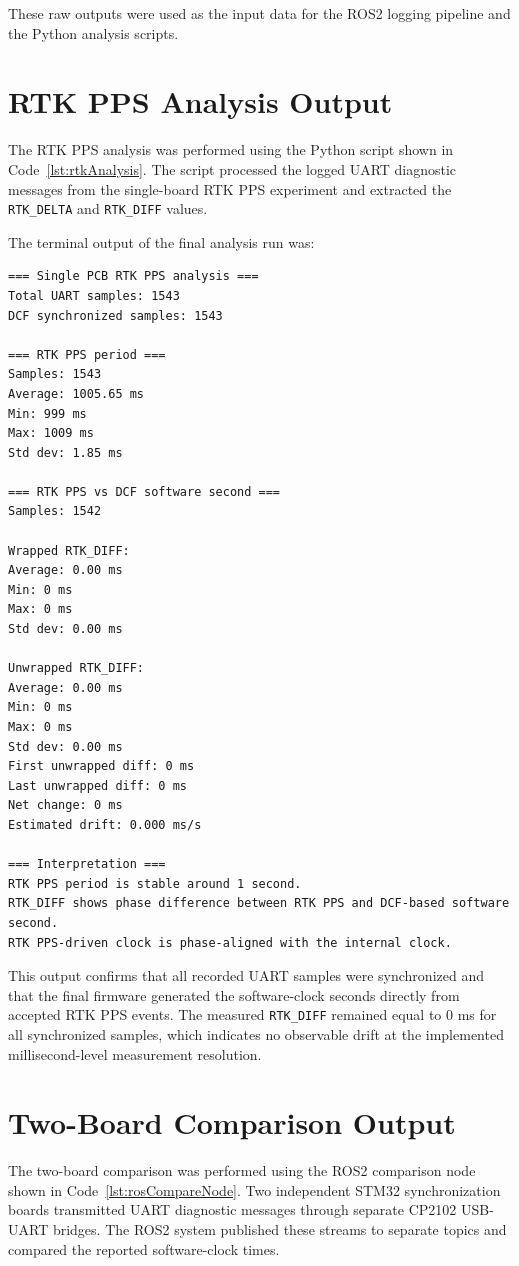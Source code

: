 These raw outputs were used as the input data for the ROS2 logging pipeline and the Python analysis scripts.

\section{RTK PPS Analysis Output}
\label{app:rtkPpsAnalysisOutput}

The RTK PPS analysis was performed using the Python script shown in Code~\ref{lst:rtkAnalysis}. The script processed the logged UART diagnostic messages from the single-board RTK PPS experiment and extracted the \texttt{RTK\_DELTA} and \texttt{RTK\_DIFF} values.

The terminal output of the final analysis run was:

\begin{verbatim}
=== Single PCB RTK PPS analysis ===
Total UART samples: 1543
DCF synchronized samples: 1543

=== RTK PPS period ===
Samples: 1543
Average: 1005.65 ms
Min: 999 ms
Max: 1009 ms
Std dev: 1.85 ms

=== RTK PPS vs DCF software second ===
Samples: 1542

Wrapped RTK_DIFF:
Average: 0.00 ms
Min: 0 ms
Max: 0 ms
Std dev: 0.00 ms

Unwrapped RTK_DIFF:
Average: 0.00 ms
Min: 0 ms
Max: 0 ms
Std dev: 0.00 ms
First unwrapped diff: 0 ms
Last unwrapped diff: 0 ms
Net change: 0 ms
Estimated drift: 0.000 ms/s

=== Interpretation ===
RTK PPS period is stable around 1 second.
RTK_DIFF shows phase difference between RTK PPS and DCF-based software second.
RTK PPS-driven clock is phase-aligned with the internal clock.
\end{verbatim}

This output confirms that all recorded UART samples were synchronized and that the final firmware generated the software-clock seconds directly from accepted RTK PPS events. The measured \texttt{RTK\_DIFF} remained equal to 0 ms for all synchronized samples, which indicates no observable drift at the implemented millisecond-level measurement resolution.

\section{Two-Board Comparison Output}
\label{app:twoBoardComparisonOutput}

The two-board comparison was performed using the ROS2 comparison node shown in Code~\ref{lst:rosCompareNode}. Two independent STM32 synchronization boards transmitted UART diagnostic messages through separate CP2102 USB-UART bridges. The ROS2 system published these streams to separate topics and compared the reported software-clock times.

